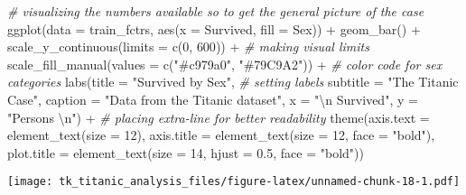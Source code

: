 \documentclass[
]{article}
\newenvironment{Shaded}{\begin{snugshade}}{\end{snugshade}}
\newcommand{\AttributeTok}[1]{\textcolor[rgb]{0.77,0.63,0.00}{#1}}
\newcommand{\CommentTok}[1]{\textcolor[rgb]{0.56,0.35,0.01}{\textit{#1}}}
\newcommand{\DecValTok}[1]{\textcolor[rgb]{0.00,0.00,0.81}{#1}}
\newcommand{\FloatTok}[1]{\textcolor[rgb]{0.00,0.00,0.81}{#1}}
\newcommand{\FunctionTok}[1]{\textcolor[rgb]{0.00,0.00,0.00}{#1}}
\newcommand{\NormalTok}[1]{#1}
\newcommand{\SpecialCharTok}[1]{\textcolor[rgb]{0.00,0.00,0.00}{#1}}
\newcommand{\StringTok}[1]{\textcolor[rgb]{0.31,0.60,0.02}{#1}}
\begin{document}
\begin{Shaded}
\begin{Highlighting}[]
\CommentTok{\# visualizing the numbers available so to get the general picture of the case}
\FunctionTok{ggplot}\NormalTok{(}\AttributeTok{data =}\NormalTok{ train\_fctrs, }\FunctionTok{aes}\NormalTok{(}\AttributeTok{x =}\NormalTok{ Survived, }\AttributeTok{fill =}\NormalTok{ Sex)) }\SpecialCharTok{+} \FunctionTok{geom\_bar}\NormalTok{() }\SpecialCharTok{+}
  \FunctionTok{scale\_y\_continuous}\NormalTok{(}\AttributeTok{limits =} \FunctionTok{c}\NormalTok{(}\DecValTok{0}\NormalTok{, }\DecValTok{600}\NormalTok{)) }\SpecialCharTok{+}              \CommentTok{\# making visual limits}
  \FunctionTok{scale\_fill\_manual}\NormalTok{(}\AttributeTok{values =} \FunctionTok{c}\NormalTok{(}\StringTok{"\#c979a0"}\NormalTok{, }\StringTok{"\#79C9A2"}\NormalTok{)) }\SpecialCharTok{+} \CommentTok{\# color code for sex categories}
  \FunctionTok{labs}\NormalTok{(}\AttributeTok{title =} \StringTok{"Survived by Sex"}\NormalTok{,                       }\CommentTok{\# setting labels}
       \AttributeTok{subtitle =} \StringTok{"The Titanic Case"}\NormalTok{,}
       \AttributeTok{caption =} \StringTok{"Data from the Titanic dataset"}\NormalTok{, }
       \AttributeTok{x =} \StringTok{"}\SpecialCharTok{\textbackslash{}n}\StringTok{ Survived"}\NormalTok{, }\AttributeTok{y =} \StringTok{"Persons }\SpecialCharTok{\textbackslash{}n}\StringTok{"}\NormalTok{) }\SpecialCharTok{+}           \CommentTok{\# placing extra{-}line for better readability}
  \FunctionTok{theme}\NormalTok{(}\AttributeTok{axis.text =} \FunctionTok{element\_text}\NormalTok{(}\AttributeTok{size =} \DecValTok{12}\NormalTok{), }
        \AttributeTok{axis.title =} \FunctionTok{element\_text}\NormalTok{(}\AttributeTok{size =} \DecValTok{12}\NormalTok{, }\AttributeTok{face =} \StringTok{"bold"}\NormalTok{), }
        \AttributeTok{plot.title =} \FunctionTok{element\_text}\NormalTok{(}\AttributeTok{size =} \DecValTok{14}\NormalTok{, }\AttributeTok{hjust =} \FloatTok{0.5}\NormalTok{, }\AttributeTok{face =} \StringTok{"bold"}\NormalTok{))}
\end{Highlighting}
\end{Shaded}

\texttt{[image: tk\_titanic\_analysis\_files/figure-latex/unnamed-chunk-18-1.pdf]}
\end{document}
